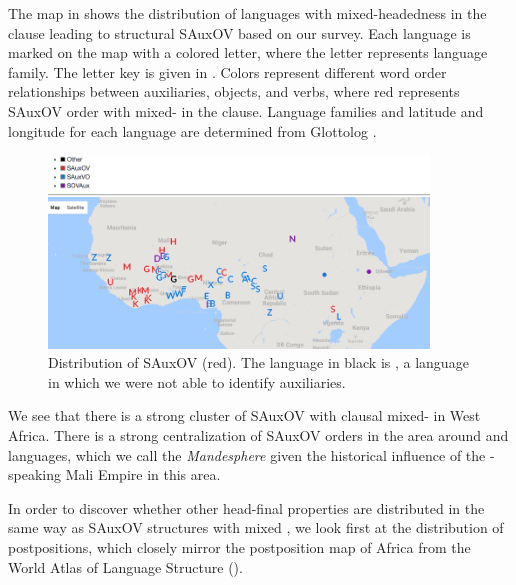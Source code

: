 \documentclass[output=paper,newtxmath,modfonts,nonflat,draftmode]{langsci/langscibook}
\begin{document}
The map in  shows the distribution of languages with mixed-head\-ed\-ness in the clause leading to structural SAuxOV based on our survey. Each language is marked on the map with a colored letter, where the letter represents language family. The letter key is given in . Colors represent different word order relationships between auxiliaries, objects, and verbs, where red represents SAuxOV order with mixed- in the clause. Language families and latitude and longitude for each language are determined from Glottolog \citep{Glottolog}.

{
  \begin{figure}
    \centering
    \includegraphics[width =0.9\textwidth]{figures/SAOV.png}
    \caption{Distribution of SAuxOV (red). The language in black is , a  language in which we were not able to identify auxiliaries.} \label{fig:sande:sauxov}
  \end{figure}
}


We see that there is a strong cluster of SAuxOV with clausal mixed- in West Africa. There is a strong centralization of SAuxOV orders in the area around  and  languages, which we call the \textit{Mandesphere} given the historical influence of the -speaking Mali Empire in this area.


In order to discover whether other head-final properties are distributed in the same way as SAuxOV structures with mixed , we look first at the distribution of postpositions, which closely mirror the postposition map of Africa from the World Atlas of Language Structure \citep{wals-85} ().
\end{document}
